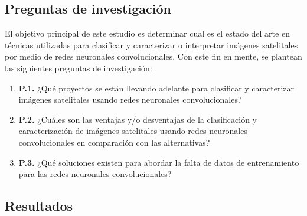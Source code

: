 \subsection{Preguntas de investigación}

El objetivo principal de este estudio es determinar cual es el estado del arte en técnicas utilizadas para clasificar y
caracterizar o interpretar imágenes satelitales por medio de redes neuronales convolucionales. Con este fin en mente,
se plantean las siguientes preguntas de investigación:

\begin{enumerate}
    \item[] {\bf P.1.} ¿Qué proyectos se están llevando adelante para clasificar y caracterizar imágenes satelitales
        usando redes neuronales convolucionales?
    \item[] {\bf P.2.} ¿Cuáles son las ventajas y/o desventajas de la clasificación y caracterización de imágenes
        satelitales usando redes neuronales convolucionales en comparación con las alternativas?
    \item[] {\bf P.3.} ¿Qué soluciones existen para abordar la falta de datos de entrenamiento para las redes
        neuronales convolucionales?
\end{enumerate}

\subsection{Resultados}

